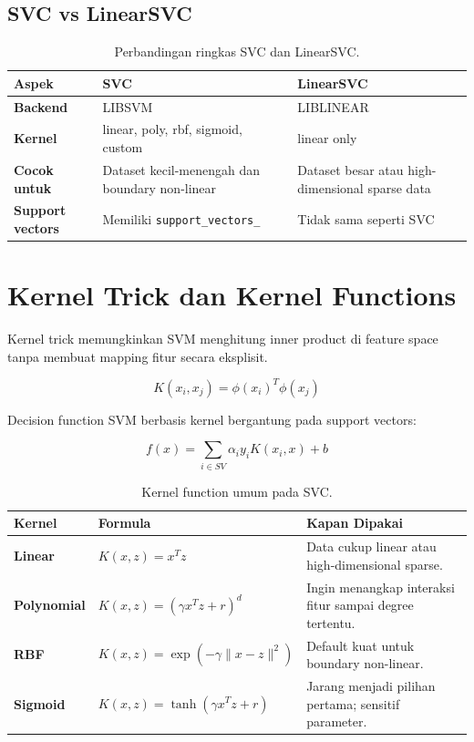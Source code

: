 \documentclass{article}
\newcommand{\code}[1]{\texttt{#1}}
\begin{document}
\subsection{SVC vs LinearSVC}

\begin{table}[H]
\centering
{}
\begin{tabularx}{\textwidth}{>{\bfseries}lXX}
\rowcolor{tableHead}
Aspek & SVC & LinearSVC \\
\toprule
Backend & LIBSVM & LIBLINEAR \\
Kernel & linear, poly, rbf, sigmoid, custom & linear only \\
Cocok untuk & Dataset kecil-menengah dan boundary non-linear & Dataset besar atau high-dimensional sparse data \\
Support vectors & Memiliki \code{support\_vectors\_} & Tidak sama seperti SVC \\
\bottomrule
\end{tabularx}
\caption{Perbandingan ringkas SVC dan LinearSVC.}
\end{table}

\section{Kernel Trick dan Kernel Functions}

Kernel trick memungkinkan SVM menghitung inner product di feature space tanpa membuat mapping fitur secara eksplisit.

\begin{equation}
K(x_i,x_j) = \phi(x_i)^T\phi(x_j)
\end{equation}

Decision function SVM berbasis kernel bergantung pada support vectors:

\begin{equation}
f(x) = \sum_{i \in SV} \alpha_i y_i K(x_i,x) + b
\end{equation}

\begin{table}[H]
\centering
{}
\begin{tabularx}{\textwidth}{>{\bfseries}lXX}
\rowcolor{softPurple}
Kernel & Formula & Kapan Dipakai \\
\toprule
Linear & $K(x,z)=x^Tz$ & Data cukup linear atau high-dimensional sparse. \\
Polynomial & $K(x,z)=(\gamma x^Tz+r)^d$ & Ingin menangkap interaksi fitur sampai degree tertentu. \\
RBF & $K(x,z)=\exp(-\gamma \lVert x-z\rVert^2)$ & Default kuat untuk boundary non-linear. \\
Sigmoid & $K(x,z)=\tanh(\gamma x^Tz+r)$ & Jarang menjadi pilihan pertama; sensitif parameter. \\
\bottomrule
\end{tabularx}
\caption{Kernel function umum pada SVC.}
\end{table}
\end{document}
